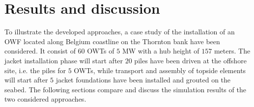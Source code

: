 \section{Results and discussion}
\label{results}
To illustrate the developed approaches, a case study of the installation of an OWF located along Belgium coastline on the Thornton bank have been considered. It consist of $60$ OWTs of $5$ MW with a hub height of $157$ meters.
The jacket installation phase will start after $20$ piles have been driven at the offshore site, i.e. the piles for $5$ OWTs, while transport and assembly of topside elements will start after $5$ jacket foundations have been installed and grouted on the seabed.
The following sections compare and discuss the simulation results of the two considered approaches.